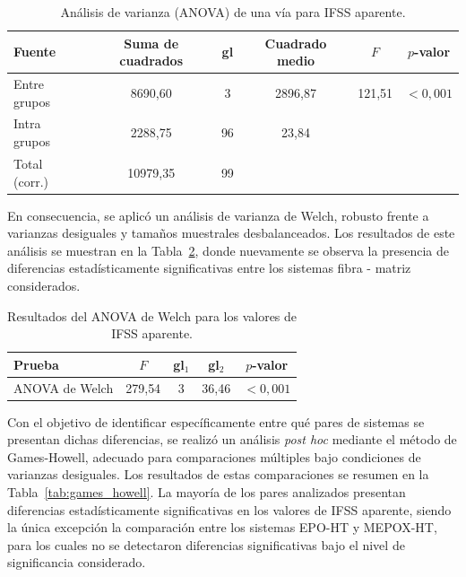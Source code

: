 \begin{table}[h!]
    \centering
    \caption{Análisis de varianza (ANOVA) de una vía para IFSS aparente.}
    \label{tab:anova_ifss}
    \begin{tabular}{l c c c c c}
        \toprule
        Fuente & Suma de cuadrados & gl & Cuadrado medio & $F$ & $p$-valor \\
        \midrule
        Entre grupos  & 8690{,}60 & 3  & 2896{,}87 & 121{,}51 & $< 0{,}001$ \\
        Intra grupos  & 2288{,}75  & 96 & 23{,}84  &        &            \\
        Total (corr.) & 10979{,}35 & 99 &        &        &            \\
        \bottomrule
    \end{tabular}
\end{table}

En consecuencia, se aplicó un análisis de varianza de Welch, robusto frente a varianzas
desiguales y tamaños muestrales desbalanceados. Los resultados de este análisis se muestran en
la Tabla~\ref{tab:anova_welch}, donde nuevamente se observa la presencia de diferencias
estadísticamente significativas entre los sistemas fibra - matriz considerados.

\begin{table}[h!]
    \centering
    \caption{Resultados del ANOVA de Welch para los valores de IFSS aparente.}
    \label{tab:anova_welch}
    \begin{tabular}{lcccc}
        \toprule
        Prueba & $F$ & gl$_1$ & gl$_2$ & $p$-valor \\
        \midrule
        ANOVA de Welch & 279{,}54 & 3 & 36{,}46 & $< 0{,}001$ \\
        \bottomrule
    \end{tabular}
\end{table}

Con el objetivo de identificar específicamente entre qué pares de sistemas se presentan dichas
diferencias, se realizó un análisis \emph{post hoc} mediante el método de Games-Howell, adecuado
para comparaciones múltiples bajo condiciones de varianzas desiguales. Los resultados de estas
comparaciones se resumen en la Tabla~\ref{tab:games_howell}. La mayoría de los pares analizados
presentan diferencias estadísticamente significativas en los valores de IFSS aparente, siendo
la única excepción la comparación entre los sistemas EPO-HT y MEPOX-HT, para los cuales no se
detectaron diferencias significativas bajo el nivel de significancia considerado.

